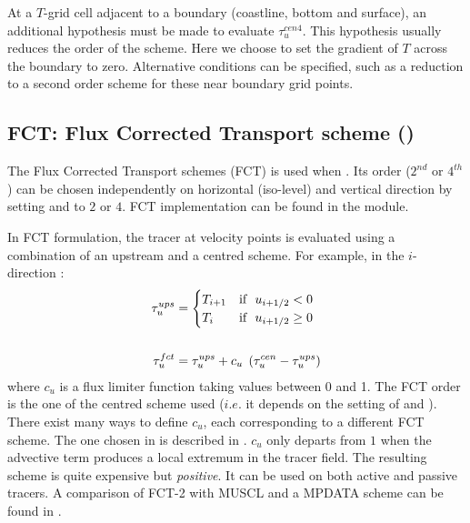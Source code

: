 \documentclass[../tex_main/NEMO_manual]{subfiles}
\begin{document}
At a $T$-grid cell adjacent to a boundary (coastline, bottom and surface),
an additional hypothesis must be made to evaluate $\tau_u^{cen4}$.
This hypothesis usually reduces the order of the scheme.
Here we choose to set the gradient of $T$ across the boundary to zero.
Alternative conditions can be specified, such as a reduction to a second order scheme for
these near boundary grid points.

\subsection{FCT: Flux Corrected Transport scheme (\protect{})}
\label{subsec:TRA_adv_tvd}

The Flux Corrected Transport schemes (FCT) is used when .
Its order ($2^{nd}$ or $4^{th}$) can be chosen independently on horizontal (iso-level) and vertical direction by
setting  and  to $2$ or $4$.
FCT implementation can be found in the  module.

In FCT formulation, the tracer at velocity points is evaluated using a combination of an upstream and
a centred scheme.
For example, in the $i$-direction :
\begin{equation} \label{eq:tra_adv_fct}
\begin{split}
\tau_u^{ups}&= \begin{cases}
 					T_{i+1} 	& \text{if $\ u_{i+1/2} <     0$} \hfill \\
 					T_i   		& \text{if $\ u_{i+1/2} \geq 0$} \hfill \\
				  \end{cases}     \\
\\
\tau_u^{fct}&=\tau_u^{ups} +c_u \;\left( {\tau_u^{cen} -\tau_u^{ups} } \right)
\end{split}
\end{equation}
where $c_u$ is a flux limiter function taking values between 0 and 1.
The FCT order is the one of the centred scheme used
($i.e.$ it depends on the setting of  and ).
There exist many ways to define $c_u$, each corresponding to a different FCT scheme.
The one chosen in \NEMO is described in \citet{Zalesak_JCP79}.
$c_u$ only departs from $1$ when the advective term produces a local extremum in the tracer field.
The resulting scheme is quite expensive but \emph{positive}.
It can be used on both active and passive tracers.
A comparison of FCT-2 with MUSCL and a MPDATA scheme can be found in \citet{Levy_al_GRL01}.
\end{document}
